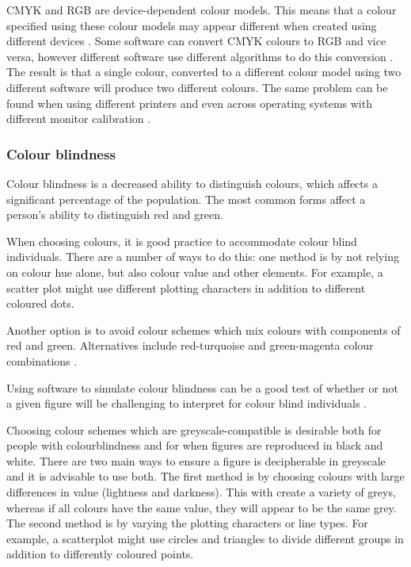 \documentclass[letterpaper]{article}\usepackage[]{graphicx}\usepackage[]{color}
\begin{document}
CMYK and RGB are device-dependent colour models. This means that a colour specified using these colour models may appear different when created using different devices \cite{silva}. Some software can convert CMYK colours to RGB and vice versa, however different software use different algorithms to do this conversion \cite{brewer-colour}. The result is that a single colour, converted to a different colour model using two different software will produce two different colours. The same problem can be found when using different printers and even across operating systems with different monitor calibration \cite{brewer-colour}. 

\subsubsection{Colour blindness}
Colour blindness is a decreased ability to distinguish colours, which affects a significant percentage of the population. The most common forms affect a person's ability to distinguish red and green.

When choosing colours, it is good practice to accommodate colour blind individuals. There are a number of ways to do this: one method is by not relying on colour hue alone, but also colour value and other elements. For example, a scatter plot might use different plotting characters in addition to different coloured dots. 

Another option is to avoid colour schemes which mix colours with components of red and green. Alternatives include red-turquoise and green-magenta colour combinations \cite{wong4}.

Using software to simulate colour blindness can be a good test of whether or not a given figure will be challenging to interpret for colour blind individuals \cite{wong4}.

Choosing colour schemes which are greyscale-compatible is desirable both for people with colourblindness and for when figures are reproduced in black and white. There are two main ways to ensure a figure is decipherable in greyscale and it is advisable to use both. The first method is by choosing colours with large differences in value (lightness and darkness). This with create a variety of greys, whereas if all colours have the same value, they will appear to be the same grey. The second method is by varying the plotting characters or line types. For example, a scatterplot might use circles and triangles to divide different groups in addition to differently coloured points. 
\end{document}
